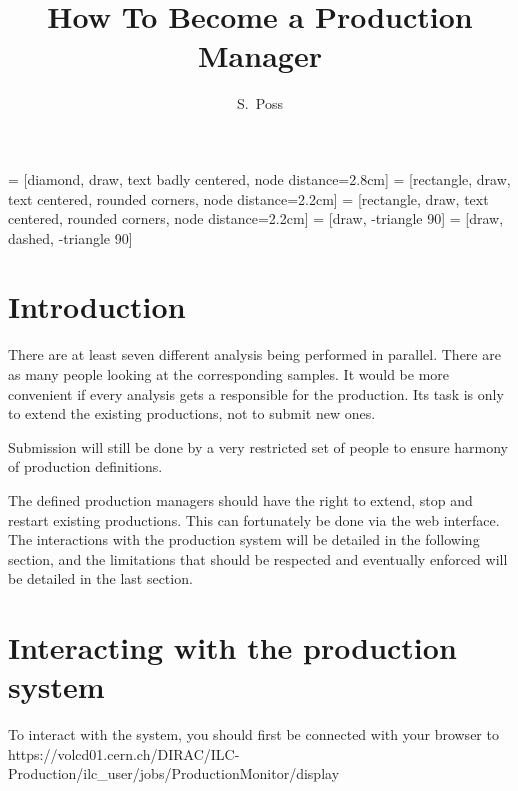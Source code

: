 \documentclass[a4paper,12pt]{article}
\title{How To Become a Production Manager}
\author{S.~Poss}
\begin{document}
 = [diamond, draw, text badly centered, node distance=2.8cm]
 = [rectangle, draw, text centered, rounded corners, node distance=2.2cm]
 = [rectangle, draw, text centered, rounded corners, node distance=2.2cm]
 = [draw, -triangle 90]
 = [draw, dashed, -triangle 90]

\maketitle
{}

\tableofcontents

\section{Introduction}
There are at least seven different analysis being performed in parallel. There
are as many people looking at the corresponding samples. It would be more
convenient if every analysis gets a responsible for the production. Its task is
only to extend the existing productions, not to submit new ones. 

Submission will
still be done by a very restricted set of people to ensure harmony of
production definitions. 

The defined production managers should have the right to extend, stop and
restart existing productions. This can fortunately be done  via the web
interface. The interactions with the production system will be detailed in the
following section, and the limitations that should be respected and eventually
enforced will be detailed in the last section.

\section{Interacting with the production system}
To interact with the system, you should first be connected with your browser
to\\
https://volcd01.cern.ch/DIRAC/ILC-Production/ilc\_user/jobs/ProductionMonitor/display
\end{document}
